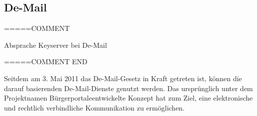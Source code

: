 \documentclass  [paper=a4,
				fontsize=12pt,
				listof=totoc,
				bibliography=totoc
				]{scrreprt}
\begin{document}
					
					
			\subsection{De-Mail}
			
			=====COMMENT
			
			Absprache Keyserver bei De-Mail
			
			=====COMMENT END
			
			Seitdem am 3. Mai 2011 das De-Mail-Gesetz in Kraft getreten ist, können die darauf basierenden De-Mail-Dienste genutzt werden.
			Das ursprünglich unter dem Projektnamen \glqq Bürgerportale\grqq entwickelte Konzept hat zum Ziel, eine elektronische und rechtlich verbindliche Kommunikation zu ermöglichen.
\end{document}
